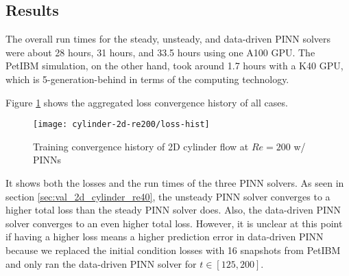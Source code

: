\subsection{Results}\label{sec:cylinder-re200-results}

The overall run times for the steady, unsteady, and data-driven PINN solvers were about 28 hours, 31 hours, and 33.5 hours using one A100 GPU.
The PetIBM simulation, on the other hand, took around 1.7 hours with a K40 GPU, which is 5-generation-behind in terms of the computing technology.

Figure \ref{fig:cylinder-re200-pinn-loss} shows the aggregated loss convergence history of all cases.
\begin{figure}
    \centering%
    \texttt{[image: cylinder-2d-re200/loss-hist]}%
    \caption{%
        Training convergence history of 2D cylinder flow at $Re=\num{200}$ w/ PINNs
    }
    \label{fig:cylinder-re200-pinn-loss}%
\end{figure}
It shows both the losses and the run times of the three PINN solvers.
As seen in section \ref{sec:val_2d_cylinder_re40}, the unsteady PINN solver converges to a higher total loss than the steady PINN solver does.
Also, the data-driven PINN solver converges to an even higher total loss.
However, it is unclear at this point if having a higher loss means a higher prediction error in data-driven PINN because we replaced the initial condition losses with 16 snapshots from PetIBM and only ran the data-driven PINN solver for $t\in[125, 200]$.

